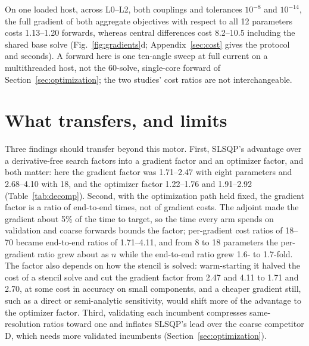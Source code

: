 \documentclass{anvil-paper}
\begin{document}
On one loaded host, across L0--L2, both couplings and tolerances $10^{-8}$
and $10^{-14}$, the full gradient of both aggregate objectives with respect
to all 12 parameters costs 1.13--1.20 forwards, whereas central differences
cost 8.2--10.5 including the shared base solve (Fig.~\ref{fig:gradients}d;
Appendix~\ref{sec:cost} gives the protocol and seconds). A forward here is
one ten-angle sweep at full current on a multithreaded host, not the
60-solve, single-core forward of Section~\ref{sec:optimization}; the two
studies' cost ratios are not interchangeable.

\section{What transfers, and limits}\label{sec:discussion}
Three findings should transfer beyond this motor. First, SLSQP's advantage
over a derivative-free search factors into a gradient factor and an
optimizer factor, and both matter: here the gradient factor was 1.71--2.47
with eight parameters and 2.68--4.10 with 18, and the optimizer factor
1.22--1.76 and 1.91--2.92 (Table~\ref{tab:decomp}). Second, with the
optimization path held fixed, the gradient factor is a ratio of
end-to-end times, not of gradient costs. The adjoint made the gradient
about 5\% of the time to target, so the time every arm spends on
validation and coarse forwards bounds the factor; per-gradient cost
ratios of 18--70 became end-to-end ratios of 1.71--4.11, and from 8 to 18
parameters the per-gradient ratio grew about as $n$ while the end-to-end
ratio grew 1.6- to 1.7-fold. The factor also depends on how the stencil is
solved: warm-starting it halved the cost of a stencil solve and cut the
gradient factor from 2.47 and 4.11 to 1.71 and 2.70, at some cost in
accuracy on small components, and a cheaper gradient still, such as a
direct or semi-analytic sensitivity, would shift more of the advantage to
the optimizer factor. Third, validating each incumbent compresses
same-resolution ratios toward one and inflates SLSQP's lead over the
coarse competitor D, which needs more validated incumbents
(Section~\ref{sec:optimization}).
\end{document}
